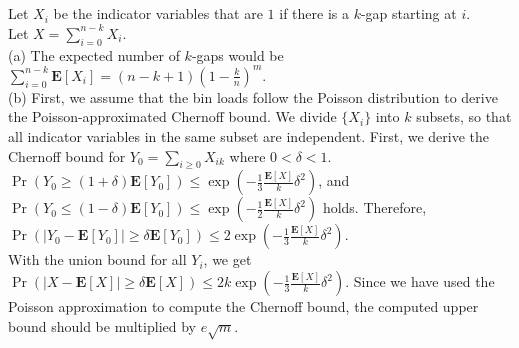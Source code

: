 \documentclass{article}
\begin{document}
\subsection{}
Let $X_i$ be the indicator variables that are $1$ if there is a $k$-gap starting at $i$.\\
Let $X=\sum\limits_{i=0}^{n-k}X_i$.\\
(a) The expected number of $k$-gaps would be $\sum\limits_{i=0}^{n-k}\textbf{E}[X_i]=(n-k+1)(1-\frac{k}{n})^m$.\\
(b) First, we assume that the bin loads follow the Poisson distribution to derive the Poisson-approximated Chernoff bound.
We divide $\{X_i\}$ into $k$ subsets, so that all indicator variables in the same subset are independent.
First, we derive the Chernoff bound for $Y_0=\sum\limits_{i\geq0}X_{ik}$ where $0<\delta<1$.\\
$\Pr(Y_0\geq(1+\delta)\textbf{E}[Y_0])\leq\exp(-\frac{1}{3}\frac{\textbf{E}[X]}{k}\delta^2)$, and
$\Pr(Y_0\leq(1-\delta)\textbf{E}[Y_0])\leq\exp(-\frac{1}{2}\frac{\textbf{E}[X]}{k}\delta^2)$ holds.
Therefore, $\Pr(|Y_0-\textbf{E}[Y_0]|\geq\delta\textbf{E}[Y_0])\leq2\exp(-\frac{1}{3}\frac{\textbf{E}[X]}{k}\delta^2)$.\\
With the union bound for all $Y_i$, we get $\Pr(|X-\textbf{E}[X]|\geq\delta\textbf{E}[X])\leq2k\exp(-\frac{1}{3}\frac{\textbf{E}[X]}{k}\delta^2)$.
Since we have used the Poisson approximation to compute the Chernoff bound, the computed upper bound should be multiplied by $e\sqrt{m}$.
\subsection{}
\end{document}

